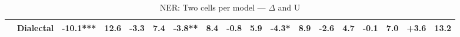\begin{table}[h]
{\begin{tabular}{llrrrrrrrrrrrrrrrr}
  & \textbf{Dialectal} & \cellcolor{red!20} \textbf{-10.1}*** & \cellcolor{blue!10} 12.6 & \cellcolor{red!6} \textbf{-3.3} & \cellcolor{blue!5} 7.4 & \cellcolor{red!7} \textbf{-3.8}** & \cellcolor{blue!6} 8.4 & \cellcolor{red!1} -0.8 & \cellcolor{blue!4} 5.9 & \cellcolor{red!8} \textbf{-4.3}* & \cellcolor{blue!7} 8.9 & \cellcolor{red!5} \textbf{-2.6} & \cellcolor{blue!3} 4.7 & \cellcolor{red!0} -0.1 & \cellcolor{blue!5} 7.0 & \cellcolor{green!7} +3.6 & \cellcolor{blue!10} 13.2 \\
\bottomrule
\end{tabular}}
\caption{NER: Two cells per model — $\Delta$ and U}\label{tab:ner_combined_cells}
\end{table}